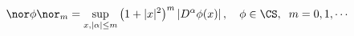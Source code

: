 \begin{equation}
\nor \phi \nor_m =\sup_{x, |\alpha |\le m} \left( 1+|x|^2 \right)^m     
	\left| D^\alpha \phi (x)\right|,\quad 
	\phi\in\CS,\;\;m=0,1,\cdots
\label{eq:topa}
\end{equation}

